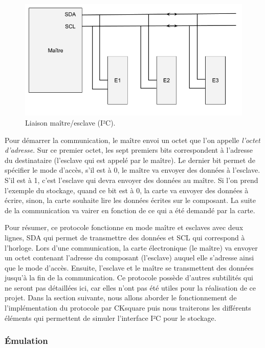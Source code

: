 \documentclass[a4paper]{article}
\begin{document}
\begin{figure}[h!] \begin{center}
\includegraphics[scale=0.4]{./img/schema-i2c.png} \caption{Liaison
maître/esclave (I²C).} \label{fig:schemai2c} \end{center} \end{figure}

Pour démarrer la communication, le maître envoi un octet que l'on appelle
\textit{l'octet d'adresse}. Sur ce premier octet, les sept premiers bits
correspondent à l'adresse du destinataire (l'esclave qui est appelé par le
maître). Le dernier bit permet de spécifier le mode d'accès, s'il est à 0, le
maître va envoyer des données à l'esclave. S'il est à 1, c'est l'esclave qui
devra envoyer des données au maître. Si l'on prend l'exemple du stockage, quand
ce bit est à 0, la carte va envoyer des données à écrire, sinon, la carte
souhaite lire les données écrites sur le composant. La suite de la communication
va vairer en fonction de ce qui a été demandé par la carte.

Pour résumer, ce protocole fonctionne en mode maître et esclaves avec deux
lignes, SDA qui permet de transmettre des données et SCL qui correspond à
l'horloge. Lors d'une communication, la carte électronique (le maître) va
envoyer un octet contenant l'adresse du composant (l'esclave) auquel elle
s'adresse ainsi que le mode d'accès. Ensuite, l'esclave et le maître se
transmettent des données jusqu'à la fin de la communication. Ce protocole
possède d'autres subtilités qui ne seront pas détaillées ici, car elles n'ont
pas été utiles pour la réalisation de ce projet. Dans la section suivante, nous
allons aborder le fonctionnement de l'implémentation du protocole par CKsquare
puis nous traiterons les différents éléments qui permettent de simuler
l'interface I²C pour le stockage.

\subsubsection*{Émulation}
\end{document}
